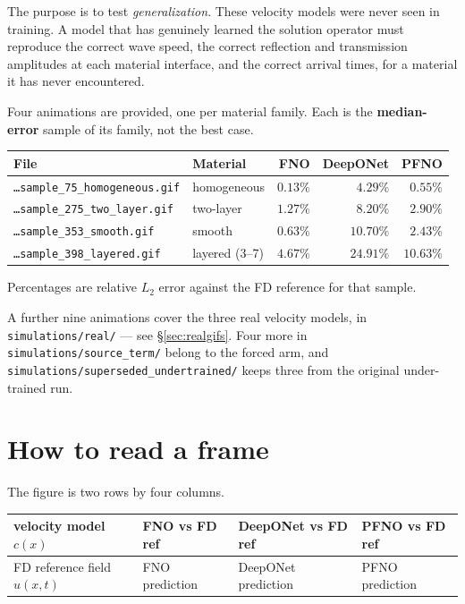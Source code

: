 \documentclass[11pt,a4paper]{article}
\newcommand{\relL}{relative $L_2$}
\begin{document}
The purpose is to test \emph{generalization}. These velocity models were never
seen in training. A model that has genuinely learned the solution operator must
reproduce the correct wave speed, the correct reflection and transmission
amplitudes at each material interface, and the correct arrival times, for a
material it has never encountered.

Four animations are provided, one per material family. Each is the
\textbf{median-error} sample of its family, not the best case.

\begin{center}
\small
\begin{tabular}{llrrr}
\toprule
\textbf{File} & \textbf{Material} & \textbf{FNO} & \textbf{DeepONet} & \textbf{PFNO}\\
\midrule
\texttt{\dots sample\_75\_homogeneous.gif} & homogeneous     & $0.13\%$ & $4.29\%$  & $0.55\%$\\
\texttt{\dots sample\_275\_two\_layer.gif} & two-layer       & $1.27\%$ & $8.20\%$  & $2.90\%$\\
\texttt{\dots sample\_353\_smooth.gif}     & smooth          & $0.63\%$ & $10.70\%$ & $2.43\%$\\
\texttt{\dots sample\_398\_layered.gif}    & layered (3--7)  & $4.67\%$ & $24.91\%$ & $10.63\%$\\
\bottomrule
\end{tabular}
\end{center}

\noindent Percentages are \relL{} error against the FD reference for that sample.

A further nine animations cover the three real velocity models, in
\texttt{simulations/real/} --- see \S\ref{sec:realgifs}. Four more in
\texttt{simulations/source\_term/} belong to the forced arm, and
\texttt{simulations/superseded\_undertrained/} keeps three from the original
under-trained run.

\section{How to read a frame}

The figure is two rows by four columns.

\begin{center}
\small
\begin{tabular}{|>{\raggedright\arraybackslash}p{3.1cm}|>{\raggedright\arraybackslash}p{3.1cm}|>{\raggedright\arraybackslash}p{3.1cm}|>{\raggedright\arraybackslash}p{3.1cm}|}
\hline
velocity model $c(x)$ & FNO vs FD ref & DeepONet vs FD ref & PFNO vs FD ref\\
\hline
FD reference field $u(x,t)$ & FNO prediction & DeepONet prediction & PFNO prediction\\
\hline
\end{tabular}
\end{center}
\end{document}
